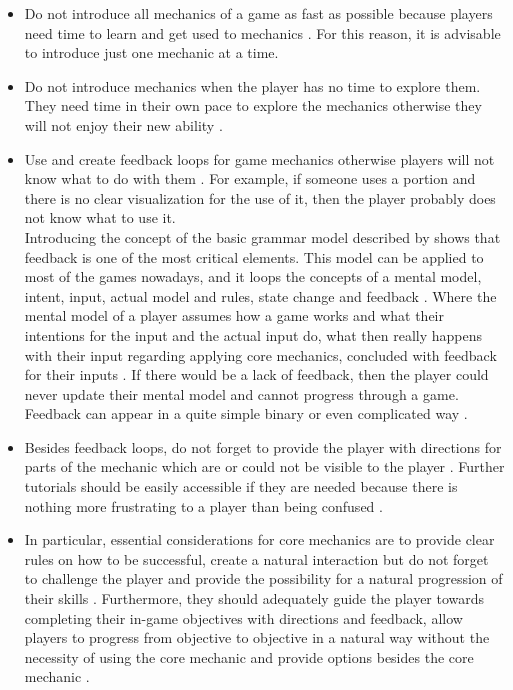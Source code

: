 \documentclass[MGS,Master,english]{twbook}%
\begin{document}
\begin{itemize}
	\item Do not introduce all mechanics of a game as fast as possible because players need time to learn and get used to mechanics \cite{mechanic::gamasutra::MaxPears}. For this reason, it is advisable to introduce just one mechanic at a time. 
	\item Do not introduce mechanics when the player has no time to explore them. They need time in their own pace to explore the mechanics otherwise they will not enjoy their new ability \cite{mechanic::gamasutra::MaxPears}. 
	\item Use and create feedback loops for game mechanics otherwise players will not know what to do with them \cite{gameDesign::gameMechanicsAdvancedGameDesign}. For example, if someone uses a portion and there is no clear visualization for the use of it, then the player probably does not know what to use it. \\
	Introducing the concept of the basic grammar model described by \cite{mechanic::BasicGrammarModel} shows that feedback is one of the most critical elements. This model can be applied to most of the games nowadays, and it loops the concepts of a mental model, intent, input, actual model and rules, state change and feedback \cite{mechanic::BasicGrammarModel}. Where the mental model of a player assumes how a game works and what their intentions for the input and the actual input do, what then really happens with their input regarding applying core mechanics, concluded with feedback for their inputs \cite{mechanic::BasicGrammarModel}. If there would be a lack of feedback, then the player could never update their mental model and cannot progress through a game. Feedback can appear in a quite simple binary or even complicated way \cite{mechanic::BasicGrammarModel}.
	\item Besides feedback loops, do not forget to provide the player with directions for parts of the mechanic which are or could not be visible to the player \cite{mechanic::gamasutra::MaxPears}. Further tutorials should be easily accessible if they are needed because there is nothing more frustrating to a player than being confused \cite{mechanic::gamasutra::DanielDoan}.
	\item In particular, essential considerations for core mechanics are to provide clear rules on how to be successful, create a natural interaction but do not forget to challenge the player and provide the possibility for a natural progression of their skills \cite{mechanic::gamasutra::DanielDoan}. Furthermore, they should adequately guide the player towards completing their in-game objectives with directions and feedback, allow players to progress from objective to objective in a natural way without the necessity of using the core mechanic and provide options besides the core mechanic \cite{mechanic::gamasutra::DanielDoan}. 

\end{itemize}
\end{document}
